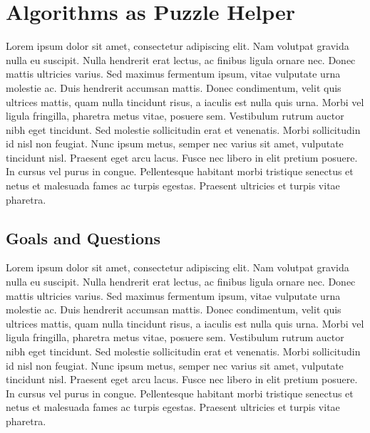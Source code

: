 \chapter{Algorithms as Puzzle Helper }
Lorem ipsum dolor sit amet, consectetur adipiscing elit. Nam volutpat gravida nulla eu suscipit. Nulla hendrerit erat lectus, ac finibus ligula ornare nec. Donec mattis ultricies varius. Sed maximus fermentum ipsum, vitae vulputate urna molestie ac. Duis hendrerit accumsan mattis. Donec condimentum, velit quis ultrices mattis, quam nulla tincidunt risus, a iaculis est nulla quis urna. Morbi vel ligula fringilla, pharetra metus vitae, posuere sem. Vestibulum rutrum auctor nibh eget tincidunt. Sed molestie sollicitudin erat et venenatis. Morbi sollicitudin id nisl non feugiat. Nunc ipsum metus, semper nec varius sit amet, vulputate tincidunt nisl. Praesent eget arcu lacus. Fusce nec libero in elit pretium posuere. In cursus vel purus in congue. Pellentesque habitant morbi tristique senectus et netus et malesuada fames ac turpis egestas. Praesent ultricies et turpis vitae pharetra.

\section{Goals and Questions}
Lorem ipsum dolor sit amet, consectetur adipiscing elit. Nam volutpat gravida nulla eu suscipit. Nulla hendrerit erat lectus, ac finibus ligula ornare nec. Donec mattis ultricies varius. Sed maximus fermentum ipsum, vitae vulputate urna molestie ac. Duis hendrerit accumsan mattis. Donec condimentum, velit quis ultrices mattis, quam nulla tincidunt risus, a iaculis est nulla quis urna. Morbi vel ligula fringilla, pharetra metus vitae, posuere sem. Vestibulum rutrum auctor nibh eget tincidunt. Sed molestie sollicitudin erat et venenatis. Morbi sollicitudin id nisl non feugiat. Nunc ipsum metus, semper nec varius sit amet, vulputate tincidunt nisl. Praesent eget arcu lacus. Fusce nec libero in elit pretium posuere. In cursus vel purus in congue. Pellentesque habitant morbi tristique senectus et netus et malesuada fames ac turpis egestas. Praesent ultricies et turpis vitae pharetra.


